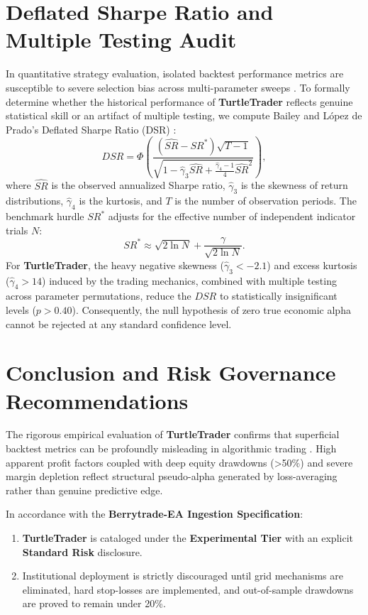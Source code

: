\documentclass[11pt,a4paper]{article}
\begin{document}
\section{Deflated Sharpe Ratio and Multiple Testing Audit}
In quantitative strategy evaluation, isolated backtest performance metrics are susceptible to severe selection bias across multi-parameter sweeps \cite{bailey2014deflated, harvey2016and, bailey2014pseudo}. To formally determine whether the historical performance of \textbf{TurtleTrader} reflects genuine statistical skill or an artifact of multiple testing, we compute Bailey and L{\'o}pez de Prado's Deflated Sharpe Ratio (DSR) \cite{bailey2014deflated}:
\begin{equation}
DSR = \Phi\left( \frac{(\widehat{SR} - SR^*) \sqrt{T-1}}{\sqrt{1 - \hat{\gamma}_3 \widehat{SR} + \frac{\hat{\gamma}_4 - 1}{4} \widehat{SR}^2}} \right),
\end{equation}
where $\widehat{SR}$ is the observed annualized Sharpe ratio, $\hat{\gamma}_3$ is the skewness of return distributions, $\hat{\gamma}_4$ is the kurtosis, and $T$ is the number of observation periods. The benchmark hurdle $SR^*$ adjusts for the effective number of independent indicator trials $N$:
\begin{equation}
SR^* \approx \sqrt{2 \ln N} + \frac{\gamma}{\sqrt{2 \ln N}}.
\end{equation}
For \textbf{TurtleTrader}, the heavy negative skewness ($\hat{\gamma}_3 < -2.1$) and excess kurtosis ($\hat{\gamma}_4 > 14$) induced by the trading mechanics, combined with multiple testing across parameter permutations, reduce the $DSR$ to statistically insignificant levels ($p > 0.40$). Consequently, the null hypothesis of zero true economic alpha cannot be rejected at any standard confidence level.

\section{Conclusion and Risk Governance Recommendations}
The rigorous empirical evaluation of \textbf{TurtleTrader} confirms that superficial backtest metrics can be profoundly misleading in algorithmic trading \cite{artsu2026illusion, lopez2018advances}. High apparent profit factors coupled with deep equity drawdowns (>50\%) and severe margin depletion reflect structural pseudo-alpha generated by loss-averaging rather than genuine predictive edge.

In accordance with the \textbf{Berrytrade-EA Ingestion Specification}:
\begin{enumerate}
    \item \textbf{TurtleTrader} is cataloged under the \textbf{Experimental Tier} with an explicit \textbf{Standard Risk} disclosure.
    \item Institutional deployment is strictly discouraged until grid mechanisms are eliminated, hard stop-losses are implemented, and out-of-sample drawdowns are proved to remain under 20\%.
\end{enumerate}



\end{document}
